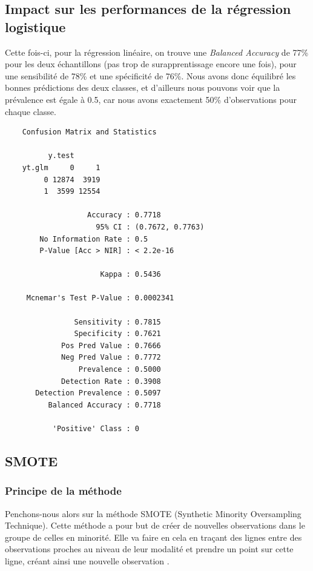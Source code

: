 \documentclass{article}
\begin{document}
\subsection{Impact sur les performances de la régression logistique}

Cette fois-ci, pour la régression linéaire, on trouve une \emph{Balanced Accuracy} de 77\% pour les deux échantillons (pas trop de surapprentissage encore une fois), pour une sensibilité de 78\% et une spécificité de 76\%. Nous avons donc équilibré les bonnes prédictions des deux classes, et d'ailleurs nous pouvons voir que la prévalence est égale à 0.5, car nous avons exactement 50\% d'observations pour chaque classe. 

\begin{multicols}{2}
    \begin{verbatim}
    Confusion Matrix and Statistics

          y.test
    yt.glm     0     1
         0 12874  3919
         1  3599 12554

                   Accuracy : 0.7718          
                     95% CI : (0.7672, 0.7763)
        No Information Rate : 0.5             
        P-Value [Acc > NIR] : < 2.2e-16       

                      Kappa : 0.5436          

     Mcnemar's Test P-Value : 0.0002341       

                Sensitivity : 0.7815          
                Specificity : 0.7621          
             Pos Pred Value : 0.7666          
             Neg Pred Value : 0.7772          
                 Prevalence : 0.5000          
             Detection Rate : 0.3908          
       Detection Prevalence : 0.5097          
          Balanced Accuracy : 0.7718          

           'Positive' Class : 0
    \end{verbatim}
\end{multicols}

\subsection{SMOTE}

\subsubsection{Principe de la méthode}

Penchons-nous alors sur la méthode SMOTE (Synthetic Minority Oversampling Technique). Cette méthode a pour but de créer de nouvelles observations dans le groupe de celles en minorité. Elle va faire en cela en traçant des lignes entre des observations proches au niveau de leur modalité et prendre un point sur cette ligne, créant ainsi une nouvelle observation \cite{smote}. 
\end{document}
